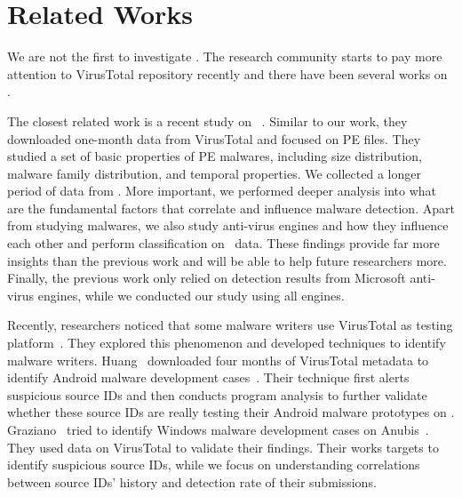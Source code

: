 \section{Related Works}
\label{sec:related}


We are not the first to investigate \vt.
The research community starts to pay more attention to VirusTotal repository recently
and there have been several works on \vt.

The closest related work is a recent study on \vt{}~\cite{SongAPsys2016}. 
Similar to our work, they downloaded one-month data from VirusTotal
and focused on PE files.
They studied a set of basic properties of PE malwares,
including size distribution, malware family distribution, and temporal properties.   
We collected a longer period of data from \vt.
More important, we performed deeper analysis into what are the fundamental factors 
that correlate and influence malware detection.
Apart from studying malwares, we also study anti-virus engines and how they influence each other
and perform classification on \vt\ data.
These findings provide far more insights than the previous work and will be able to help future researchers more.
Finally, the previous work only relied on detection results from Microsoft anti-virus engines,
while we conducted our study using all engines.

Recently, researchers noticed that some malware writers use VirusTotal as testing platform~\cite{huangvt2016bigdata, neeles}.
They explored this phenomenon and developed techniques to identify malware writers. 
Huang \etal\ downloaded four months of VirusTotal metadata to identify Android malware development cases~\cite{huangvt2016bigdata}. 
Their technique first alerts suspicious source IDs 
and then conducts program analysis to further validate whether 
these source IDs are really testing their Android malware prototypes on \vt{}. 
Graziano \etal\ tried to identify Windows malware development cases on Anubis~\cite{neeles}. 
They used data on VirusTotal to validate their findings. 
Their works targets to identify suspicious source IDs, 
while we focus on understanding correlations between source IDs' history and detection rate of their submissions.

